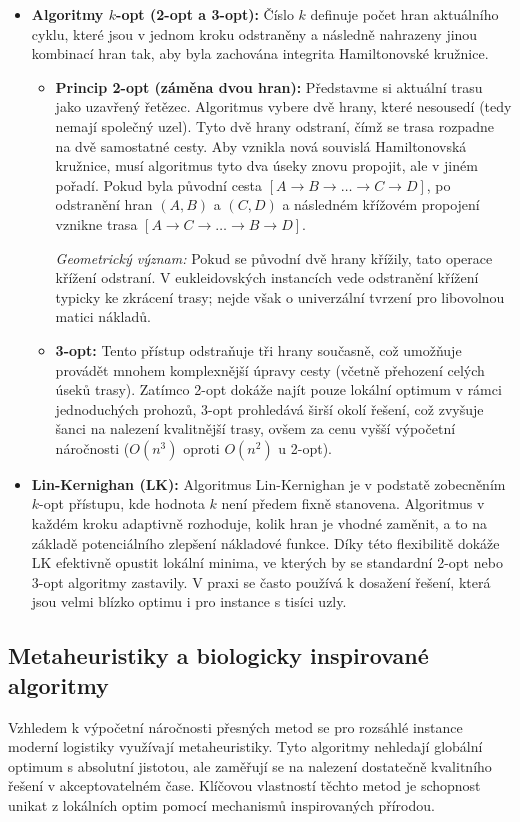 \begin{itemize}
    \item \textbf{Algoritmy $k$-opt (2-opt a 3-opt):} Číslo $k$ definuje počet hran aktuálního cyklu, které jsou v jednom kroku odstraněny a následně nahrazeny jinou kombinací hran tak, aby byla zachována integrita Hamiltonovské kružnice.
    \begin{itemize}
    \item \textbf{Princip 2-opt (záměna dvou hran):} 
    Představme si aktuální trasu jako uzavřený řetězec. Algoritmus vybere dvě hrany, které nesousedí (tedy nemají společný uzel). Tyto dvě hrany odstraní, čímž se trasa rozpadne na dvě samostatné cesty. Aby vznikla nová souvislá Hamiltonovská kružnice, musí algoritmus tyto dva úseky znovu propojit, ale v jiném pořadí.
    Pokud byla původní cesta $[A \to B \to \dots \to C \to D]$, po odstranění hran $(A,B)$ a $(C,D)$ a následném křížovém propojení vznikne trasa $[A \to C \to \dots \to B \to D]$. 
    
    
    \textit{Geometrický význam:} Pokud se původní dvě hrany křížily, tato operace křížení odstraní. V eukleidovských instancích vede odstranění křížení typicky ke zkrácení trasy; nejde však o univerzální tvrzení pro libovolnou matici nákladů.
        \item \textbf{3-opt:} Tento přístup odstraňuje tři hrany současně, což umožňuje provádět mnohem komplexnější úpravy cesty (včetně přehození celých úseků trasy). Zatímco 2-opt dokáže najít pouze lokální optimum v rámci jednoduchých prohozů, 3-opt prohledává širší okolí řešení, což zvyšuje šanci na nalezení kvalitnější trasy, ovšem za cenu vyšší výpočetní náročnosti ($O(n^3)$ oproti $O(n^2)$ u 2-opt).
\end{itemize}
    \item \textbf{Lin-Kernighan (LK):} Algoritmus Lin-Kernighan je v podstatě zobecněním $k$-opt přístupu, kde hodnota $k$ není předem fixně stanovena. Algoritmus v každém kroku adaptivně rozhoduje, kolik hran je vhodné zaměnit, a to na základě potenciálního zlepšení nákladové funkce. Díky této flexibilitě dokáže LK efektivně opustit lokální minima, ve kterých by se standardní 2-opt nebo 3-opt algoritmy zastavily. V praxi se často používá k dosažení řešení, která jsou velmi blízko optimu i pro instance s tisíci uzly.
\end{itemize}

\subsection{Metaheuristiky a biologicky inspirované algoritmy}
\label{subsection:BIA}
Vzhledem k výpočetní náročnosti přesných metod se pro rozsáhlé instance moderní logistiky využívají metaheuristiky. Tyto algoritmy nehledají globální optimum s absolutní jistotou, ale zaměřují se na nalezení dostatečně kvalitního řešení v akceptovatelném čase. Klíčovou vlastností těchto metod je schopnost unikat z lokálních optim pomocí mechanismů inspirovaných přírodou.

